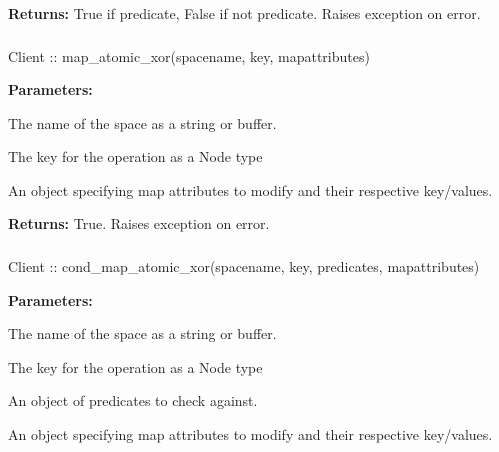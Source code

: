 \noindent\textbf{Returns:}
True if predicate, False if not predicate.  Raises exception on error.

\subsubsection{}
\label{api:nodejs:map_atomic_xor}
\begin{javascriptcode}
Client :: map_atomic_xor(spacename, key, mapattributes)
\end{javascriptcode}


\noindent\textbf{Parameters:}
\begin{description}[labelindent=\widthof{{\code{mapattributes}}},leftmargin=*,noitemsep,nolistsep,align=right]
\item[\code{spacename}] The name of the space as a string or buffer.
\item[\code{key}] The key for the operation as a Node type
\item[\code{mapattributes}] An object specifying map attributes to modify and their respective key/values.
\end{description}

\noindent\textbf{Returns:}
True.  Raises exception on error.

\subsubsection{}
\label{api:nodejs:cond_map_atomic_xor}
\begin{javascriptcode}
Client :: cond_map_atomic_xor(spacename, key, predicates, mapattributes)
\end{javascriptcode}


\noindent\textbf{Parameters:}
\begin{description}[labelindent=\widthof{{\code{mapattributes}}},leftmargin=*,noitemsep,nolistsep,align=right]
\item[\code{spacename}] The name of the space as a string or buffer.
\item[\code{key}] The key for the operation as a Node type
\item[\code{predicates}] An object of predicates to check against.
\item[\code{mapattributes}] An object specifying map attributes to modify and their respective key/values.
\end{description}

